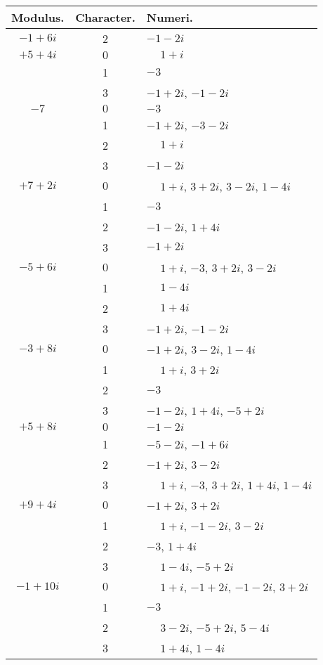 \documentclass[twoside,12pt]{memoir}
\begin{document}
\begin{center}
\begin{tabular}{c|c|l}
Modulus. & Character. & Numeri. \\
\hline
\(-1+6 i\) & 2 & \(-1-2 i\) \\
 \(+5+4 i\)& \(0\) & \(\phantom{+}1+i\) \\
 & 1 & \(-3\) \\
 & 3 & \(-1+2 i\), \(-1-2 i\) \\
\(-7\)  & \(0\) & \(-3\) \\
 & 1 & \(-1+2 i\), \(-3-2 i\) \\
 & 2 & \(\phantom{+}1+i\) \\
 & 3 & \(-1-2 i\) \\
\(+7+2 i\) & \(0\) & \(\phantom{+}1+i\), \( 3+2 i\), \( 3-2 i\), \( 1-4 i\) \\
 & 1 & \(-3\) \\
 & 2 & \(-1-2 i\), \( 1+4 i\) \\
 & 3 & \(-1+2 i\) \\
\(-5+6 i\) & \(0\) & \(\phantom{+}1+i\), \(-3\), \(3+2 i\), \( 3-2 i\) \\
 & 1 & \(\phantom{+}1-4 i\) \\
 & 2 & \(\phantom{+}1+4 i\) \\
 & 3 & \(-1+2 i\), \(-1-2 i\) \\
\(-3+8 i\) & \(0\) & \(-1+2 i\), \( 3-2 i\), \( 1-4 i\) \\
 & 1 & \(\phantom{+}1+i\), \( 3+2 i\) \\
 & 2 & \(-3\) \\
 & 3 & \(-1-2 i\), \( 1+4 i\), \(-5+2 i\) \\
\(+5+8 i\) & \(0\) & \(-1-2 i\) \\
 & 1 & \(-5-2 i\), \(-1+6 i\) \\
 & 2 & \(-1+2 i\), \( 3-2 i\) \\
 & 3 & \(\phantom{+}1+i\), \(-3\), \(3+2 i\), \( 1+4 i\), \( 1-4 i\) \\
\(+9+4 i\) & \(0\) & \(-1+2 i\), \( 3+2 i\) \\
 & 1 & \(\phantom{+}1+i\), \(-1-2 i\), \( 3-2 i\) \\
 & 2 & \(-3\), \(1+4 i\) \\
 & 3 & \(\phantom{+}1-4 i\), \(-5+2 i\) \\
\(-1+10 i\) & \(0\) & \(\phantom{+}1+i\), \(-1+2 i\), \(-1-2 i\), \( 3+2 i\) \\
 & 1 & \(-3\) \\
 & 2 & \(\phantom{+}3-2 i\), \(-5+2 i\), \( 5-4 i\) \\
 & 3 & \(\phantom{+}1+4 i\), \( 1-4 i\) \\
\end{tabular}\pagebreak%


\end{center}
\end{document}

